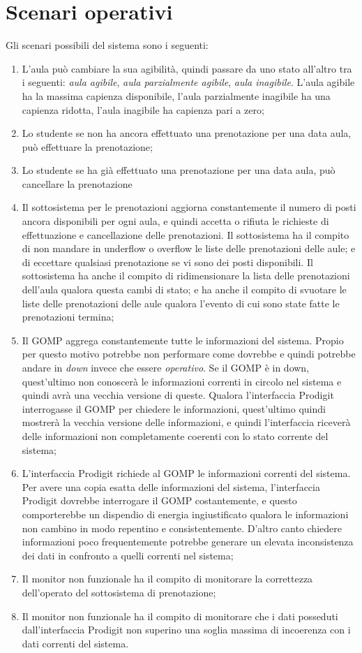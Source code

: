 \documentclass[11pt]{article}
\begin{document}
	\newpage
	\section{Scenari operativi}
	Gli scenari possibili del sistema sono i seguenti:
	\begin{enumerate}
		\itemsep0em
		\item L'aula può cambiare la sua agibilità, quindi passare da uno stato all'altro tra i seguenti: \textit{aula agibile}, \textit{aula parzialmente agibile}, \textit{aula inagibile}. L'aula agibile ha la massima capienza disponibile, l'aula parzialmente inagibile ha una capienza ridotta, l'aula inagibile ha capienza pari a zero;
		\item Lo studente se non ha ancora effettuato una prenotazione per una data aula, può effettuare la prenotazione;
		\item Lo studente se ha già effettuato una prenotazione per una data aula, può cancellare la prenotazione
		\item Il sottosistema per le prenotazioni aggiorna constantemente il numero di posti ancora disponibili per ogni aula, e quindi accetta o rifiuta le richieste di effettuazione e cancellazione delle prenotazioni. Il sottosistema ha il compito di non mandare in underflow o overflow le liste delle prenotazioni delle aule; e di eccettare qualsiasi prenotazione se vi sono dei posti disponibili. Il sottosistema ha anche il compito di ridimensionare la lista delle prenotazioni dell'aula qualora questa cambi di stato; e ha anche il compito di svuotare le liste delle prenotazioni delle aule qualora l'evento di cui sono state fatte le prenotazioni termina;
		\item Il GOMP aggrega constantemente tutte le informazioni del sistema. Propio per questo motivo potrebbe non performare come dovrebbe e quindi potrebbe andare in \textit{down} invece che essere \textit{operativo}. Se il GOMP è in down, quest'ultimo non conoscerà le informazioni correnti in circolo nel sistema e quindi avrà una vecchia versione di queste. Qualora l'interfaccia Prodigit interrogasse il GOMP per chiedere le informazioni, quest'ultimo quindi mostrerà la vecchia versione delle informazioni, e quindi l'interfaccia riceverà delle informazioni non completamente coerenti con lo stato corrente del sistema;
		\item L'interfaccia Prodigit richiede al GOMP le informazioni correnti del sistema. Per avere una copia esatta delle informazioni del sistema, l'interfaccia Prodigit dovrebbe interrogare il GOMP costantemente, e questo comporterebbe un dispendio di energia ingiustificato qualora le informazioni non cambino in modo repentino e consistentemente. D'altro canto chiedere informazioni poco frequentemente potrebbe generare un elevata inconsistenza dei dati in confronto a quelli correnti nel sistema;
		\item Il monitor non funzionale ha il compito di monitorare la correttezza dell'operato del sottosistema di prenotazione;
		\item Il monitor non funzionale ha il compito di monitorare che i dati posseduti dall'interfaccia Prodigit non superino una soglia massima di incoerenza con i dati correnti del sistema.
	\end{enumerate}
	
\end{document}
